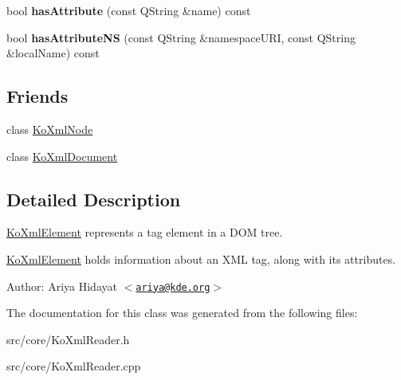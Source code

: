 \begin{CompactItemize}
\item 
\hypertarget{classKoXmlElement_2a4784923c11d9d33ce187b55c562601}{
bool \textbf{hasAttribute} (const QString \&name) const }
\label{classKoXmlElement_2a4784923c11d9d33ce187b55c562601}

\item 
\hypertarget{classKoXmlElement_8879ebfc276ad89f9de6aa3dab5b063d}{
bool \textbf{hasAttributeNS} (const QString \&namespaceURI, const QString \&localName) const }
\label{classKoXmlElement_8879ebfc276ad89f9de6aa3dab5b063d}

\end{CompactItemize}
\subsection*{Friends}
\begin{CompactItemize}
\item 
\hypertarget{classKoXmlElement_6c97883f92c7cbf2ecdf17db6cea8297}{
class \hyperlink{classKoXmlElement_6c97883f92c7cbf2ecdf17db6cea8297}{KoXmlNode}}
\label{classKoXmlElement_6c97883f92c7cbf2ecdf17db6cea8297}

\item 
\hypertarget{classKoXmlElement_7f0a67ef52ddc6542737225a82e4f487}{
class \hyperlink{classKoXmlElement_7f0a67ef52ddc6542737225a82e4f487}{KoXmlDocument}}
\label{classKoXmlElement_7f0a67ef52ddc6542737225a82e4f487}

\end{CompactItemize}


\subsection{Detailed Description}
\hyperlink{classKoXmlElement}{KoXmlElement} represents a tag element in a DOM tree.

\hyperlink{classKoXmlElement}{KoXmlElement} holds information about an XML tag, along with its attributes.

\begin{Desc}
\item[Author:]Ariya Hidayat $<$\href{mailto:ariya@kde.org}{\tt ariya@kde.org}$>$ \end{Desc}


The documentation for this class was generated from the following files:\begin{CompactItemize}
\item 
src/core/KoXmlReader.h\item 
src/core/KoXmlReader.cpp\end{CompactItemize}
